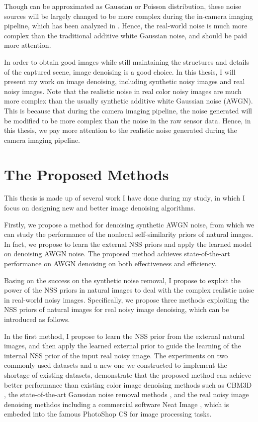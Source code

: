 Though can be approximated as Gaussian or Poisson distribution, these noise sources will be largely changed to be more complex during the in-camera imaging pipeline, which has been analyzed in \cite{crosschannel}. Hence, the real-world noise is much more complex than the traditional additive white Gaussian noise, and should be paid more attention.

In order to obtain good images while still maintaining the structures and details of the captured scene, image denoising is a good choice. In this thesis, I will present my work on image denoising, including synthetic noisy images and real noisy images. Note that the realistic noise in real color noisy images are much more complex than the usually synthetic additive white Gaussian noise (AWGN). This is because that during the camera imaging pipeline, the noise generated will be modified to be more complex than the noise in the raw sensor data. Hence, in this thesis, we pay more attention to the realistic noise generated during the camera imaging pipeline. 


\section{The Proposed Methods}
\label{sec:intro:new}

This thesis is made up of several work I have done during my study, in which I focus on designing new and better image denoising algorithms. 

Firstly, we propose a method for denoising synthetic AWGN noise, from which we can study the performance of the nonlocal self-similarity priors of natural images. In fact, we propose to learn the external NSS priors and apply the learned model on denoising AWGN noise. The proposed method achieves state-of-the-art performance on AWGN denoising on both effectiveness and efficiency. 

Basing on the success on the synthetic noise removal, I propose to exploit the power of the NSS priors in natural images to deal with the complex realistic noise in real-world noisy images. Specifically, we propose three methods exploiting the NSS priors of natural images for real noisy image denoising, which can be introduced as follows.

In the first method, I propose to learn the NSS prior from the external natural images, and then apply the learned external prior to guide the learning of the internal NSS prior of the input real noisy image. The experiments on two commonly used datasets and a new one we constructed to implement the shortage of existing datasets, demonstrate that the proposed method can achieve better performance than existing color image denoising methods such as CBM3D \cite{cbm3d}, the state-of-the-art Gaussian noise removal methods \cite{bm3d,mlp,csr}, and the real noisy image denoising methdos \cite{} including a commercial software Neat Image \cite{neatimage}, which is embeded into the famous PhotoShop CS for image processing tasks.


